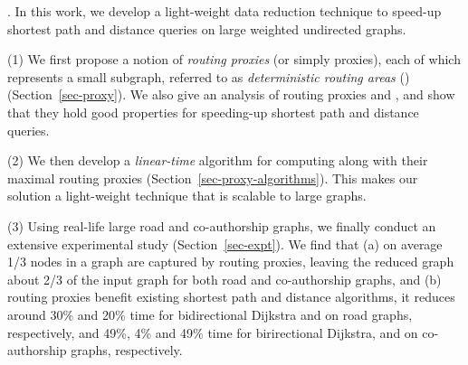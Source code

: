 . In this work, we develop a light-weight data reduction technique to speed-up shortest  path and distance queries on large weighted undirected graphs.



\stab (1) We first propose a notion of {\em routing proxies} (or simply proxies), each of which represents a small subgraph, referred to as  {\em deterministic routing areas} (\dras)  (Section~\ref{sec-proxy}). We also give an analysis of routing proxies and \dras, and show that they hold good properties for speeding-up shortest path and distance queries.

\stab (2) We then develop a {\em linear-time} algorithm for computing \dras along with their maximal routing proxies (Section~\ref{sec-proxy-algorithms}). This makes our solution a light-weight technique that is scalable to large graphs.


\stab (3) Using real-life large road and co-authorship graphs, we finally conduct an extensive experimental study (Section~\ref{sec-expt}).
We find that (a) on average 1/3 nodes in a graph are captured by routing proxies, leaving the reduced graph about 2/3 of the input graph for both road and co-authorship graphs, and  (b) routing proxies benefit existing shortest  path and distance algorithms, \eg it reduces around 30\% and 20\% time for  bidirectional Dijkstra \cite{LubyR89} and \arcflag \cite{MohringSSWW05} on road graphs, respectively, and 49\%, 4\% and 49\% time for birirectional Dijkstra, \arcflag and \tnr \cite{arz2013transit} on co-authorship graphs, respectively.





